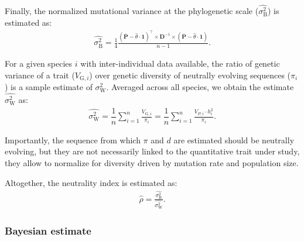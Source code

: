 \documentclass{article}
\newcommand{\Multiply}{\cdot}
\newcommand{\MultiplyMatrix}{\times}
\newcommand{\UniDimArray}[1]{\bm{#1}}
\newcommand{\BiDimArray}[1]{\bm{#1}}
\newcommand{\tr}{^{\intercal}}
\newcommand{\inv}{^{-1}}
\newcommand{\Spi}{i}
\newcommand{\NbrTaxa}{n}
\newcommand{\Trait}{P}
\newcommand{\Heredity}{h^2}
\newcommand{\VecTrait}{\UniDimArray{\bar{\Trait}}}
\newcommand{\RootTrait}{\widehat{\theta}}
\newcommand{\VecOne}{\UniDimArray{1}}
\newcommand{\Distance}{\BiDimArray{D}}
\newcommand{\DistanceMatrix}{\BiDimArray{\Distance}}
\newcommand{\VarGeneticSpi}{V_{\mathrm{G}, \Spi}}
\newcommand{\RatePhy}{\sigma^2_{\mathrm{B}}}
\newcommand{\RatePop}{\sigma^2_{\mathrm{W}}}
\newcommand{\EstRatePhy}{\widehat{\RatePhy}}
\newcommand{\EstRatePop}{\widehat{\RatePop}}
\newcommand{\EstNI}{\widehat{\rho}}
\begin{document}
Finally, the normalized mutational variance at the phylogenetic scale ($\EstRatePhy$) is estimated\cite{omeara_testing_2006} as:
\begin{gather}
    \EstRatePhy = \frac{1}{4}\frac{\left( \VecTrait -  \RootTrait \Multiply \VecOne \right)\tr \MultiplyMatrix \DistanceMatrix\inv \MultiplyMatrix \left( \VecTrait -  \RootTrait \Multiply \VecOne  \right)}{\NbrTaxa - 1}. \label{eq:estimated-rate-phy}
\end{gather}

For a given species $\Spi$ with inter-individual data available, the ratio of genetic variance of a trait ($\VarGeneticSpi$) over genetic diversity of neutrally evolving sequences ($\pi_{\Spi}$) is a sample estimate of $\RatePop$.
Averaged across all species, we obtain the estimate $\EstRatePop$ as:
\begin{gather}
    \EstRatePop = \dfrac{1}{\NbrTaxa}\sum_{i=1}^{\NbrTaxa}\frac{  \VarGeneticSpi}{ \pi_{i}} = \dfrac{1}{\NbrTaxa}\sum_{i=1}^{\NbrTaxa} \frac{  V_{\Trait, i} \Multiply \Heredity_{i}}{ \pi_{i}}. \label{eq:estimated-rate-pop}
\end{gather}

Importantly, the sequence from which $\pi$ and $d$ are estimated should be neutrally evolving, but they are not necessarily linked to the quantitative trait under study, they allow to normalize for diversity driven by mutation rate and population size.

Altogether, the neutrality index is estimated as:
\begin{gather}
    \EstNI = \frac{\EstRatePhy}{\EstRatePop}. \label{eq:estimated-NI}
\end{gather}

\subsubsection{Bayesian estimate}
\end{document}
